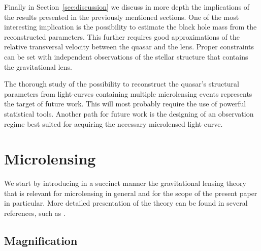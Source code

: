 \documentclass[usenatbib]{mn2e}
\begin{document}
Finally in Section~\ref{sec:discussion} we discuss in more depth the
implications of the results presented in the previously mentioned
sections.  One of the most interesting implication is the possibility
to estimate the black hole mass from the reconstructed
parameters. This further requires good approximations of the relative
transversal velocity between the quasar and the lens. Proper
constraints can be set with independent observations of the stellar
structure that contains the gravitational lens.

The thorough study of the possibility to reconstruct the quasar's
structural parameters from light-curves containing multiple
microlensing events represents the target of future work. This will
most probably require the use of powerful statistical tools. Another
path for future work is the designing of an observation regime best
suited for acquiring the necessary microlensed light-curve.
\section{Microlensing}\label{sec:microlensing}

We start by introducing in a succinct manner the gravitational lensing
theory that is relevant for microlensing in general and for the scope
of the present paper in particular.  More detailed presentation of the
theory can be found in several references, such as
\cite{2001stgl.book.....P}.

\subsection{Magnification}
\end{document}
